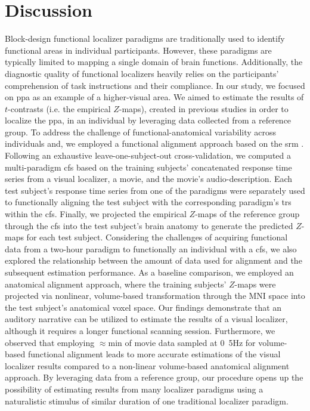 \section{Discussion}


%
Block-design functional localizer paradigms are traditionally used to identify
functional areas in individual participants.
%
However, these paradigms are typically limited to mapping a single domain of
brain functions.
%
Additionally, the diagnostic quality of functional localizers heavily relies on
the participants' comprehension of task instructions and their compliance.
%
In our study, we focused on \ac{ppa} as an example of a higher-visual area.
%
We aimed to estimate the results of $t$-contrasts (i.e. the empirical $Z$-maps),
created in previous studies \citep{sengupta2016extension,
haeusler2022processing} in order to localize the \ac{ppa}, in an individual by
leveraging data collected from a reference group.
%
To address the challenge of functional-anatomical variability across individuals
and, we employed a functional alignment approach based on the \acf{srm}
\citep{chen2015reduced}.
%
Following an exhaustive leave-one-subject-out cross-validation, we computed a
multi-paradigm \acf{cfs} based on the training subjects' concatenated response
time series from a visual localizer, a movie, and the movie's audio-description.
%
Each test subject's response time series from one of the paradigms were
separately used to functionally aligning the test subject with the corresponding
paradigm's \acp{tr} within the \ac{cfs}.
%
Finally, we projected the empirical $Z$-maps of the reference group through the
\ac{cfs} into the test subject's brain anatomy to generate the predicted
$Z$-maps for each test subject.
%
Considering the challenges of acquiring functional data from a two-hour paradigm
to functionally an individual with a \ac{cfs}, we also explored the relationship
between the amount of data used for alignment and the subsequent estimation
performance.
%
As a baseline comparison, we employed an anatomical alignment approach, where
the training subjects' $Z$-maps were projected via nonlinear, volume-based
transformation through the MNI space into the test subject's anatomical voxel
space.
%
Our findings demonstrate that an auditory narrative can be utilized to estimate
the results of a visual localizer, although it requires a longer functional
scanning session.
%
Furthermore, we observed that employing $\approx$\unit[15]{min} of movie data
sampled at \unit{0.5}{Hz} for volume-based functional alignment leads to more
accurate estimations of the visual localizer results compared to a non-linear
volume-based anatomical alignment approach.
%
By leveraging data from a reference group, our procedure opens up the
possibility of estimating results from many localizer paradigms using a
naturalistic stimulus of similar duration of one traditional localizer paradigm.





